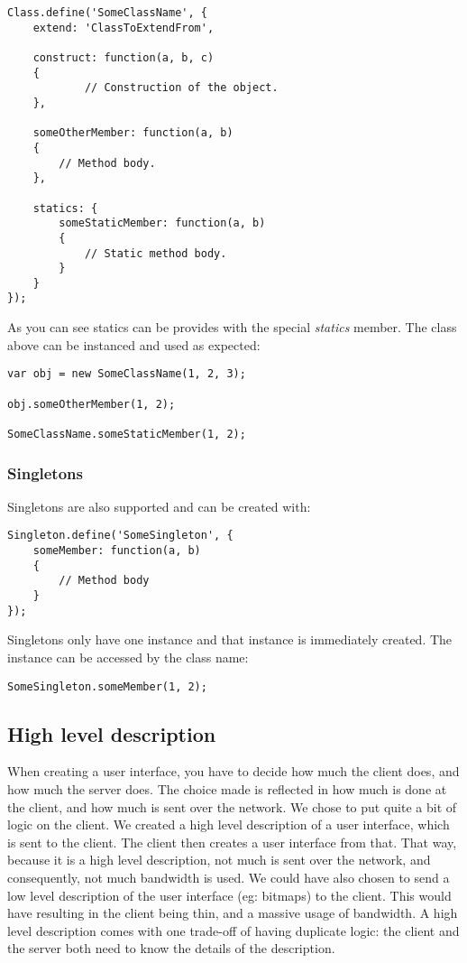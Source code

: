 \documentclass[11pt,a4paper]{article}
\begin{document}
\begin{verbatim}
Class.define('SomeClassName', {
    extend: 'ClassToExtendFrom',
    
    construct: function(a, b, c)
    {
    		// Construction of the object.
    },
    
    someOtherMember: function(a, b)
    {
        // Method body.
    },
    
    statics: {
        someStaticMember: function(a, b)
        {
            // Static method body.
        }
    }
});
\end{verbatim}

\newpage
As you can see statics can be provides with the special \textit{statics} member.
The class above can be instanced and used as expected:

\begin{verbatim}
var obj = new SomeClassName(1, 2, 3);

obj.someOtherMember(1, 2);

SomeClassName.someStaticMember(1, 2);
\end{verbatim}

\subsubsection{Singletons}
Singletons are also supported and can be created with:

\begin{verbatim}
Singleton.define('SomeSingleton', {
    someMember: function(a, b)
    {
        // Method body
    }
});
\end{verbatim}

Singletons only have one instance and that instance is immediately created.
The instance can be accessed by the class name:

\begin{verbatim}
SomeSingleton.someMember(1, 2);
\end{verbatim}

\subsection{High level description}

When creating a user interface, you have to decide how much the client does, and how much the server does.
The choice made is reflected in how much is done at the client, and how much is sent over the network.
We chose to put quite a bit of logic on the client.
We created a high level description of a user interface, which is sent to the client.
The client then creates a user interface from that.
That way, because it is a high level description, not much is sent over the network, and consequently, not much bandwidth is used.
We could have also chosen to send a low level description of the user interface (eg: bitmaps) to the client.
This would have resulting in the client being thin, and a massive usage of bandwidth.
A high level description comes with one trade-off of having duplicate logic: the client and the server both need to know the details of the description.
\end{document}
